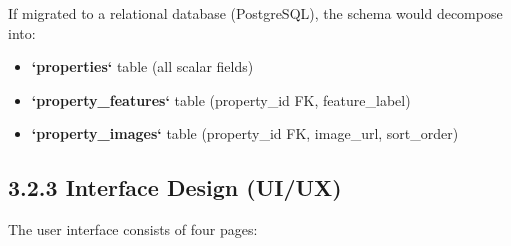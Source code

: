 \documentclass[12pt,a4paper]{report}
\begin{document}
If migrated to a relational database (PostgreSQL), the schema would decompose into:

\begin{itemize}
  \item \textbullet{} \textbf{`properties`} table (all scalar fields)
  \item \textbullet{} \textbf{`property\_features`} table (property\_id FK, feature\_label)
  \item \textbullet{} \textbf{`property\_images`} table (property\_id FK, image\_url, sort\_order)
\end{itemize}
\subsection{3.2.3 Interface Design (UI/UX)}
The user interface consists of four pages:
\end{document}
